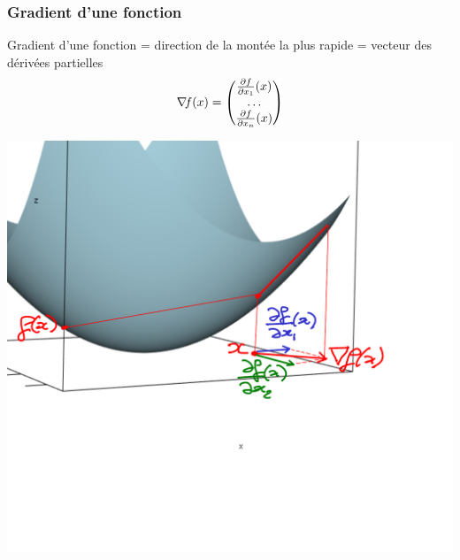 \documentclass[12pt]{beamer}
\begin{document}
\begin{frame}
\begin{itemize}
\begin{frame}
\frametitle{Gradient d'une fonction} 
Gradient d'une fonction = direction de la montée la plus rapide = vecteur des dérivées partielles
\begin{equation*}
\nabla\!{f}(x) = \begin{pmatrix} \frac{\partial f}{\partial x_1}(x) \\ \ldots \\ \frac{\partial f}{\partial x_n}(x) \end{pmatrix}
\end{equation*}
\begin{center}
\begin{minipage}[t]{0.7\textwidth}
\includegraphics[width=\textwidth]{gradient-crop.pdf} \\
\end{minipage}
\end{center}
\end{frame}


\end{itemize}
\end{frame}
\end{document}

